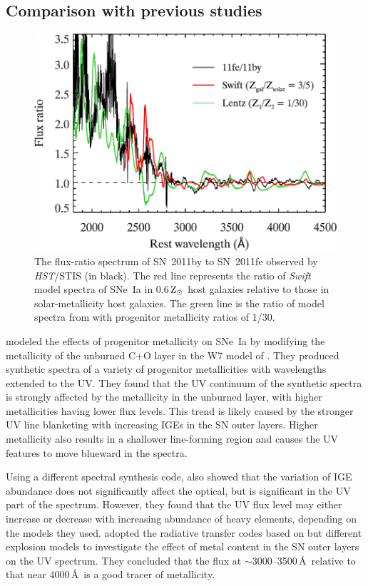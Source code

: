 \documentclass[useAMS,usenatbib]{mn2e}
\begin{document}
\subsection{Comparison with previous studies}
\label{sec:theory-compare}
\begin{figure}
	\centering
		\includegraphics[scale=0.49]{plot/uv_spec_model_max_metal2.pdf}
                \caption{The flux-ratio spectrum of SN~2011by to SN~2011fe observed by {\it HST}/STIS (in black). The red line represents the ratio of {\it Swift} model spectra of SNe~Ia in 0.6\,$\rm Z_{\odot}$ host galaxies relative to those in solar-metallicity host galaxies. The green line is the ratio of model spectra from \citet{2000ApJ...530..966L} with progenitor metallicity ratios of 1/30.}
        \label{uv-model-compare}
\end{figure}

\citet{2000ApJ...530..966L} modeled the effects of progenitor metallicity on SNe~Ia by modifying the metallicity of the unburned C+O layer in the W7 model of \citet{1984ApJ...286..644N}. They produced synthetic spectra of a variety of progenitor metallicities with wavelengths extended to the UV. They found that the UV continuum of the synthetic spectra is strongly affected by the metallicity in the unburned layer, with higher metallicities having lower flux levels. This trend is likely caused by the stronger UV line blanketing with increasing IGEs in the SN outer layers. Higher metallicity also results in a shallower line-forming region and causes the UV features to move blueward in the spectra. 

Using a different spectral synthesis code, \citet{2008MNRAS.391.1605S} also showed that the variation of IGE abundance does not significantly affect the optical, but is significant in the UV part of the spectrum. However, they found that the UV flux level may either increase or decrease with increasing abundance of heavy elements, depending on the models they used. \citet{2012MNRAS.427..103W} adopted the radiative transfer codes based on \citet{2008MNRAS.391.1605S} but different explosion models to investigate the effect of metal content in the SN outer layers on the UV spectrum. They concluded that the flux at $\sim3000$--3500\,\AA\ relative to that near 4000\,\AA\ is a good tracer of metallicity.
\end{document}
